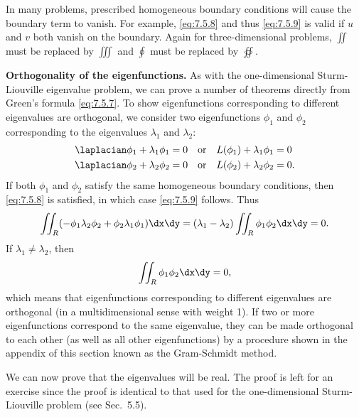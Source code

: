 In many problems, prescribed homogeneous boundary conditions will cause the boundary term to vanish.  For example, \eqref{eq:7.5.8} and thus \eqref{eq:7.5.9} is valid if $u$ and $v$ both vanish on the boundary.  Again for three-dimensional problems, $\iint$ must be replaced by $\iiint$ and $\oint$ must be replaced by $\oiint$.

\textbf{Orthogonality of the eigenfunctions.}  As with the one-dimensional Sturm-Liouville eigenvalue problem, we can prove a number of theorems directly from Green's formula \eqref{eq:7.5.7}.  To show eigenfunctions corresponding to different eigenvalues are orthogonal, we consider two eigenfunctions $\phi_1$ and $\phi_2$ corresponding to the eigenvalues $\lambda_1$ and $\lambda_2$:
\begin{equation}
\begin{aligned}
\laplacian\phi_1 + \lambda_1\phi_1 &= 0 \quad\text{or}\quad L(\phi_1) + \lambda_1\phi_1 = 0 \\
\laplacian\phi_2 + \lambda_2\phi_2 &= 0 \quad\text{or}\quad L(\phi_2) + \lambda_2\phi_2 = 0.
\end{aligned}
\label{eq:7.5.10}
\end{equation}
If both $\phi_1$ and $\phi_2$ satisfy the same homogeneous boundary conditions, then \eqref{eq:7.5.8} is satisfied, in which case \eqref{eq:7.5.9} follows.  Thus
\[
\iint_R (-\phi_1\lambda_2\phi_2 + \phi_2\lambda_1\phi_1)\dx\dy = (\lambda_1 - \lambda_2)\iint_R \phi_1\phi_2\dx\dy = 0.
\]
If $\lambda_1 \neq \lambda_2$, then
\begin{equation}
\iint_R \phi_1\phi_2\dx\dy = 0,
\label{eq:7.5.11}
\end{equation}
which means that eigenfunctions corresponding to different eigenvalues are orthogonal (in a multidimensional sense with weight 1).  If two or more eigenfunctions correspond to the same eigenvalue, they can be made orthogonal to each other (as well as all other eigenfunctions) by a procedure shown in the appendix of this section known as the Gram-Schmidt method.

We can now prove that the eigenvalues will be real.  The proof is left for an exercise since the proof is identical to that used for the one-dimensional Sturm-Liouville problem (see Sec.~5.5).

